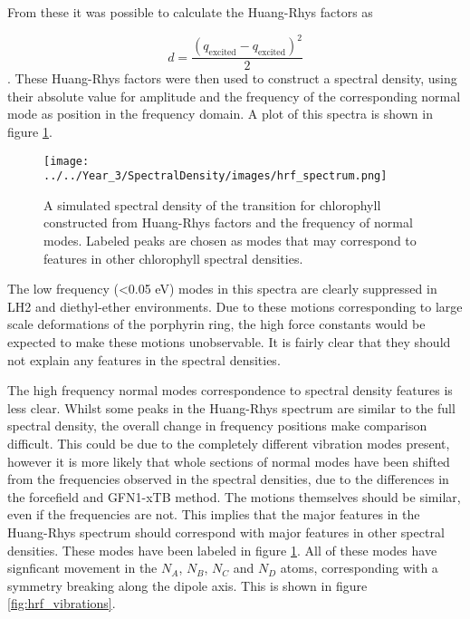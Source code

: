 From these it was possible to calculate the Huang-Rhys factors as

\begin{equation}
    d = \frac{\left(q_{\text{excited}} - q_{\text{excited}}\right)^2}{2}
\end{equation}
%
. These Huang-Rhys factors were then used to construct a spectral density, using
their absolute value for amplitude and the frequency of the corresponding normal
mode as position in the frequency domain. A plot of this spectra is shown in figure 
\ref{fig:specdens_hrf}.

\begin{figure}
    \centering
    \texttt{[image: ../../Year\_3/SpectralDensity/images/hrf\_spectrum.png]}
    \label{fig:specdens_hrf}
    \caption{A simulated spectral density of the \Qy transition for chlorophyll 
    constructed from Huang-Rhys factors and the frequency of normal modes. Labeled
    peaks are chosen as modes that may correspond to features in other chlorophyll
    spectral densities.}
\end{figure}

The low frequency (<0.05 eV) modes in this spectra are clearly suppressed in LH2
and diethyl-ether environments. Due to these motions corresponding to large scale
deformations of the porphyrin ring, the high force constants would be expected to
make these motions unobservable. It is  fairly clear that they should not explain
any features in the spectral densities.

The high frequency normal modes correspondence to spectral density features is less
clear. Whilst some peaks in the Huang-Rhys spectrum are similar to the full spectral
density, the overall change in frequency positions make comparison difficult. This
could be due to the completely different vibration modes present, however it is 
more likely that whole sections of normal modes have been shifted from the frequencies
observed in the spectral densities, due to the differences in the forcefield and
GFN1-xTB method. The motions themselves should be similar, even if the frequencies 
are not. This implies that the major features in the Huang-Rhys spectrum should 
correspond with major features in other spectral densities. These modes have been
labeled in figure \ref{fig:specdens_hrf}. All of these modes have signficant movement
in the $N_A$, $N_B$, $N_C$ and $N_D$ atoms, corresponding with a symmetry breaking
along the \Qy dipole axis. This is shown in figure \ref{fig:hrf_vibrations}.

